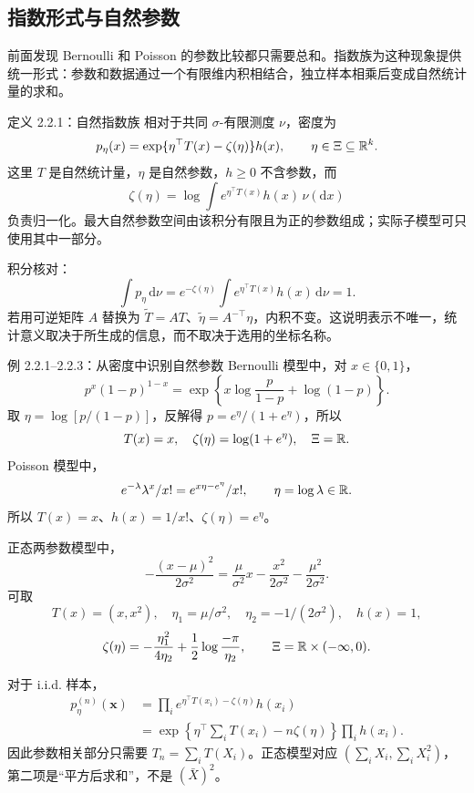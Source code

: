 \subsection{指数形式与自然参数}
前面发现 Bernoulli 和 Poisson 的参数比较都只需要总和。指数族为这种现象提供统一形式：参数和数据通过一个有限维内积相结合，独立样本相乘后变成自然统计量的求和。

\begin{definitionbox}{定义 2.2.1：自然指数族}
相对于共同 $\sigma$-有限测度 $\nu$，密度为
\[
 p_\eta(x)=\exp\{\eta^\top T(x)-\zeta(\eta)\}h(x),
 \qquad \eta\in\Xi\subseteq\mathbb R^k.
\]
这里 $T$ 是自然统计量，$\eta$ 是自然参数，$h\ge0$ 不含参数，而
\[
 \zeta(\eta)=\log\int e^{\eta^\top T(x)}h(x)\,\nu(\mathrm dx)
\]
负责归一化。最大自然参数空间由该积分有限且为正的参数组成；实际子模型可只使用其中一部分。
\end{definitionbox}

积分核对：
\[
 \int p_\eta\,\mathrm d\nu
 =e^{-\zeta(\eta)}\int e^{\eta^\top T(x)}h(x)\,\mathrm d\nu=1.
\]
若用可逆矩阵 $A$ 替换为 $\widetilde T=AT$、$\widetilde\eta=A^{-\top}\eta$，内积不变。这说明表示不唯一，统计意义取决于所生成的信息，而不取决于选用的坐标名称。

\begin{examplebox}{例 2.2.1--2.2.3：从密度中识别自然参数}
Bernoulli 模型中，对 $x\in\{0,1\}$，
\[
 p^x(1-p)^{1-x}
 =\exp\left\{x\log\frac p{1-p}+\log(1-p)\right\}.
\]
取 $\eta=\log[p/(1-p)]$，反解得 $p=e^\eta/(1+e^\eta)$，所以
\[
 T(x)=x,\quad \zeta(\eta)=\log(1+e^\eta),\quad \Xi=\mathbb R.
\]
Poisson 模型中，
\[
 e^{-\lambda}\lambda^x/x!
 =e^{x\eta-e^\eta}/x!,\qquad\eta=\log\lambda\in\mathbb R.
\]
所以 $T(x)=x$、$h(x)=1/x!$、$\zeta(\eta)=e^\eta$。

正态两参数模型中，
\[
 -\frac{(x-\mu)^2}{2\sigma^2}
 =\frac{\mu}{\sigma^2}x-\frac{x^2}{2\sigma^2}
 -\frac{\mu^2}{2\sigma^2}.
\]
可取
\[
 T(x)=(x,x^2),\quad
 \eta_1=\mu/\sigma^2,\quad \eta_2=-1/(2\sigma^2),\quad h(x)=1,
\]
\[
 \zeta(\eta)=-\frac{\eta_1^2}{4\eta_2}
 +\frac12\log\frac{-\pi}{\eta_2},
 \qquad \Xi=\mathbb R\times(-\infty,0).
\]
\end{examplebox}

对于 i.i.d. 样本，
\[
 \begin{aligned}
 p_\eta^{(n)}(\mathbf x)
 &=\prod_i e^{\eta^\top T(x_i)-\zeta(\eta)}h(x_i)\\
 &=\exp\left\{\eta^\top\sum_iT(x_i)-n\zeta(\eta)\right\}
   \prod_i h(x_i).
 \end{aligned}
\]
因此参数相关部分只需要 $T_n=\sum_iT(X_i)$。正态模型对应 $(\sum_iX_i,\sum_iX_i^2)$，第二项是“平方后求和”，不是 $(\bar X)^2$。

